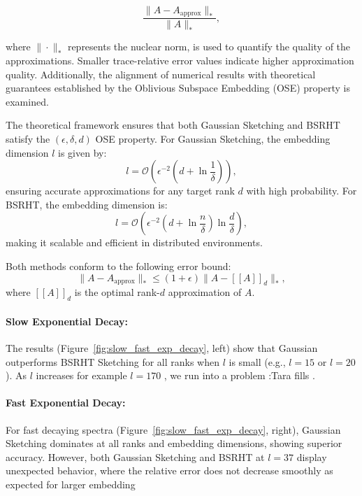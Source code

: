 \documentclass[a4paper, 12pt,oneside]{article}
\begin{document}
	\begin{equation}
	\frac{\|A - A_{\text{approx}}\|_*}{\|A\|_*},
	\end{equation}
	
	where $\|\cdot\|_*$ represents the nuclear norm, is used to quantify the quality of the approximations. Smaller trace-relative error values indicate higher approximation quality. Additionally, the alignment of numerical results with theoretical guarantees established by the Oblivious Subspace Embedding (OSE) property is examined.
	
	The theoretical framework ensures that both Gaussian Sketching and BSRHT satisfy the $(\epsilon, \delta, d)$ OSE property. For Gaussian Sketching, the embedding dimension $l$ is given by:
	\begin{equation}
	l = \mathcal{O}\left(\epsilon^{-2}(d + \ln \frac{1}{\delta})\right),
	\end{equation}
	ensuring accurate approximations for any target rank $d$ with high probability. For BSRHT, the embedding dimension is:
	\begin{equation}
	l = \mathcal{O}\left(\epsilon^{-2}(d + \ln \frac{n}{\delta}) \ln \frac{d}{\delta}\right),
	\end{equation}
	making it scalable and efficient in distributed environments.
	
	Both methods conform to the following error bound:
	\begin{equation}
	\|A - A_{\text{approx}}\|_* \leq (1 + \epsilon) \|A - [[A]]_d\|_*,
	\end{equation}
	where $[[A]]_d$ is the optimal rank-$d$ approximation of $A$.

	\paragraph{Slow Exponential Decay:}

The results (Figure~\ref{fig:slow_fast_exp_decay}, left) show that Gaussian outperforms BSRHT Sketching for all ranks when $l$ is small (e.g., $l = 15$ or $l = 20$). 
As $l$ increases for example $l=170$ , we run into a problem :Tara fills . 


\paragraph{Fast Exponential Decay:}
For fast decaying spectra (Figure~\ref{fig:slow_fast_exp_decay}, right), Gaussian Sketching dominates at all ranks and embedding dimensions, showing superior accuracy. 
However, both Gaussian Sketching and BSRHT at $l=37$ display unexpected behavior, 
where the relative error does not decrease smoothly as expected for larger embedding 
\end{document}
